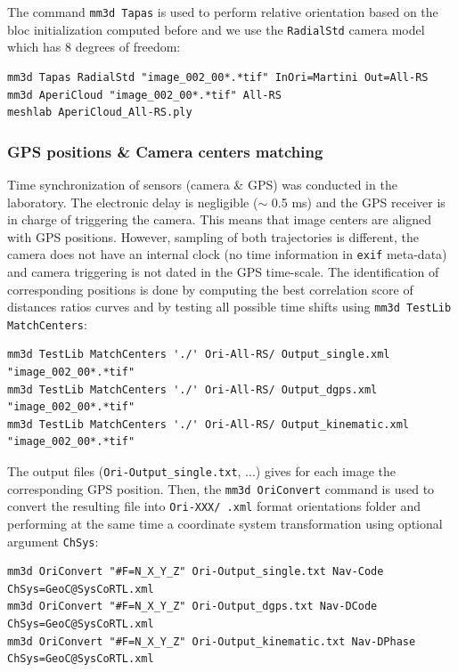 The command {\tt mm3d Tapas} is used to perform relative orientation based on the bloc initialization computed before and we use the {\tt RadialStd} camera model which has 8 degrees of freedom:

\begin{verbatim}
mm3d Tapas RadialStd "image_002_00*.*tif" InOri=Martini Out=All-RS
mm3d AperiCloud "image_002_00*.*tif" All-RS
meshlab AperiCloud_All-RS.ply
\end{verbatim}

\subsubsection{GPS positions \& Camera centers matching}
Time synchronization of sensors (camera \& GPS) was conducted in the laboratory. The electronic delay is negligible ($\sim$ 0.5 ms) and the GPS receiver is in charge of triggering the camera. This means that image centers are aligned with GPS positions. However, sampling of both trajectories is different, the camera does not have an internal clock (no time information in {\tt exif} meta-data) and camera triggering is not dated in the GPS time-scale. The identification of corresponding positions is done by computing the best correlation score of distances ratios curves and by testing all possible time shifts using {\tt mm3d TestLib MatchCenters}:

\begin{verbatim}
mm3d TestLib MatchCenters './' Ori-All-RS/ Output_single.xml "image_002_00*.*tif"
mm3d TestLib MatchCenters './' Ori-All-RS/ Output_dgps.xml "image_002_00*.*tif"
mm3d TestLib MatchCenters './' Ori-All-RS/ Output_kinematic.xml "image_002_00*.*tif"
\end{verbatim}

The output files ({\tt Ori-Output\_single.txt}, ...) gives for each image the corresponding GPS position. Then, the {\tt mm3d OriConvert} command is used to convert the resulting file into {\tt Ori-XXX/ .xml} format orientations folder and performing at the same time a coordinate system transformation using optional argument {\tt ChSys}:

\begin{verbatim}
mm3d OriConvert "#F=N_X_Y_Z" Ori-Output_single.txt Nav-Code ChSys=GeoC@SysCoRTL.xml
mm3d OriConvert "#F=N_X_Y_Z" Ori-Output_dgps.txt Nav-DCode ChSys=GeoC@SysCoRTL.xml
mm3d OriConvert "#F=N_X_Y_Z" Ori-Output_kinematic.txt Nav-DPhase ChSys=GeoC@SysCoRTL.xml
\end{verbatim}


